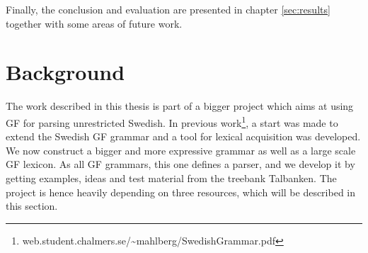 \documentclass{report}
\begin{document}
Finally, the conclusion and evaluation are
presented in chapter \ref{sec:results} together with some areas of future work.






\chapter{Background}  
\label{sec:background}
The work described in this thesis is part of a bigger project which aims at
using GF for parsing unrestricted Swedish. 
In previous work\footnote{web.student.chalmers.se/\~{}mahlberg/SwedishGrammar.pdf}, a start was made to extend the Swedish GF grammar
and a tool for lexical acquisition was developed.
We now construct a bigger
and more expressive grammar as well as a large scale GF lexicon.
As all GF grammars, this one defines a parser, and we develop it by getting
examples, ideas and test material from the treebank Talbanken.
The project is hence heavily depending on three resources, which will be described
in this section.
\end{document}
